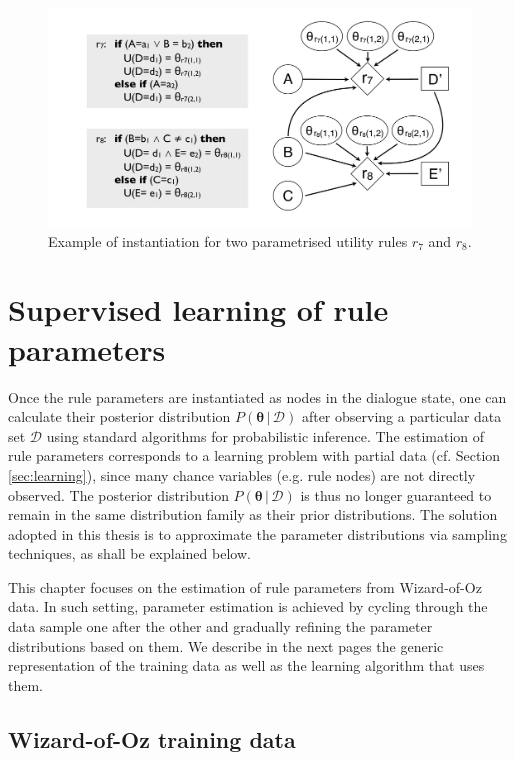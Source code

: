 \begin{figure}[h!]
\centering
\includegraphics[scale=0.25]{imgs/ruleinstantiation2_params.pdf}
\caption{Example of instantiation for two parametrised utility rules $r_7$ and $r_8$.}
\label{fig:ruleinstantiation_params2}
\end{figure}


\section{Supervised learning of rule parameters}
\label{sec:rule-supervised}

Once the rule parameters are instantiated as nodes in the dialogue state, one can calculate their posterior distribution $P(\boldsymbol\theta \, | \, \mathcal{D})$ after observing a particular data set $\mathcal{D}$ using standard algorithms for probabilistic inference. The estimation of rule parameters corresponds to a learning problem with partial data (cf. Section \ref{sec:learning}), since many chance variables (e.g. rule nodes) are not directly observed. The posterior distribution $P(\boldsymbol\theta \, | \, \mathcal{D})$ is thus no longer guaranteed to remain in the same distribution family as their prior distributions.  The solution adopted in this thesis is to approximate the parameter distributions via sampling techniques, as shall be explained below. 

This chapter focuses on the estimation of rule parameters from Wizard-of-Oz data.  In such setting, parameter estimation is achieved by cycling through the data sample one after the other and gradually refining the parameter distributions based on them. We describe in the next pages the generic representation of the training data as well as the learning algorithm that uses them. 

\subsection{Wizard-of-Oz training data}
\label{sec:rule-supervised-oz}

